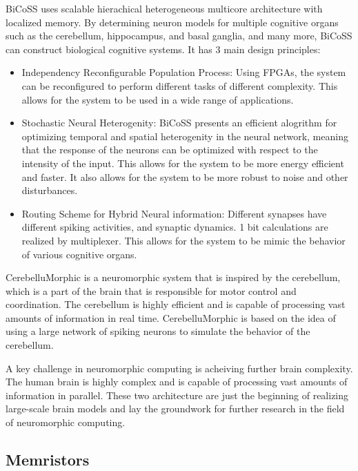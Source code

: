 \documentclass[screen, acmtog]{acmart}
\begin{document}
BiCoSS uses scalable hierachical heterogeneous multicore architecture with localized memory. By determining neuron models for multiple cognitive organs such as the cerebellum, hippocampus, and basal ganglia, and many more, BiCoSS can construct biological cognitive systems. It has 3 main design principles:

\begin{itemize}
    \item Independency Reconfigurable Population Process: Using FPGAs, the system can be reconfigured to perform different tasks of different complexity. This allows for the system to be used in a wide range of applications. 
    \item Stochastic Neural Heterogenity: BiCoSS presents an efficient alogrithm for optimizing temporal and spatial heterogenity in the neural network, meaning that the response of the neurons can be optimized with respect to the intensity of the input. This allows for the system to be more energy efficient and faster. It also allows for the system to be more robust to noise and other disturbances.
    \item Routing Scheme for Hybrid Neural information: Different synapses have different spiking activities, and synaptic dynamics. 1 bit calculations are realized by multiplexer. This allows for the system to be mimic the behavior of various cognitive organs.
\end{itemize}

CerebelluMorphic is a neuromorphic system that is inspired by the cerebellum, which is a part of the brain that is responsible for motor control and coordination. The cerebellum is highly efficient and is capable of processing vast amounts of information in real time. CerebelluMorphic is based on the idea of using a large network of spiking neurons to simulate the behavior of the cerebellum. 

A key challenge in neuromorphic computing is acheiving further brain complexity. The human brain is highly complex and is capable of processing vast amounts of information in parallel. These two architecture are just the beginning of realizing large-scale brain models and lay the groundwork for further research in the field of neuromorphic computing.

\subsection{Memristors\cite{MemristorProgress}}
\end{document}
